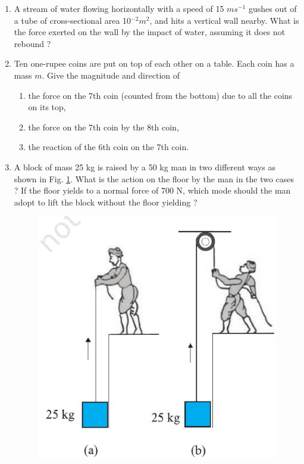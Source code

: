 \begin{enumerate}[label=\arabic*.,ref=\thesection.\theenumi]
\item  A stream of water flowing horizontally with a speed of 15 $m s^{-1}$ gushes out of a tube of
cross-sectional area 10$^{-2} m^2$, and hits a vertical wall nearby. What is the force exerted on the wall by the impact of water, assuming it does not rebound ?
\item Ten one-rupee coins are put on top of each other on a table. Each coin has a mass $m$. Give the magnitude and direction of 
\begin{enumerate}
\item the force on the 7th coin (counted from the bottom) due to all the coins on its top,
\item the force on the 7th coin by the 8th coin,
\item  the reaction of the 6th coin on the 7th coin.
\end{enumerate}
\item  A block of mass 25 kg is raised by a 50 kg man in two different ways as shown in Fig. \ref{fig:5.19}. What is the action on the floor by the man in the two cases ? If the floor yields to a normal force of 700 N, which mode should the man adopt to lift the block without the floor yielding ?
\begin{figure}[!ht]
\centering
\includegraphics[width=\columnwidth]{./figs/11-1/5/5.19.eps}
\caption{}
\label{fig:5.19}
\end{figure} 


\end{enumerate}
